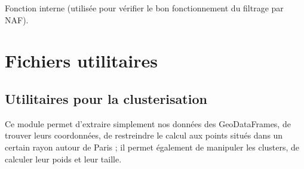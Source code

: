 \documentclass[letterpaper,10pt,french]{sphinxmanual}
\begin{document}
\begin{fulllineitems}
\label{\detokenize{index:src.clusterizer.clusterizer.test_naf}}
\sphinxAtStartPar
Fonction interne (utilisée pour vérifier le bon fonctionnement du filtrage par NAF).

\end{fulllineitems}



\section{Fichiers utilitaires}
\label{\detokenize{index:fichiers-utilitaires}}

\subsection{Utilitaires pour la clusterisation}
\label{\detokenize{index:module-src.clusterizer.utils.clusterizer_utils}}\label{\detokenize{index:utilitaires-pour-la-clusterisation}}
\sphinxAtStartPar
Ce module permet d’extraire simplement nos données des GeoDataFrames, de trouver
leurs coordonnées, de restreindre le calcul aux points situés dans un certain rayon
autour de Paris ; il permet également de manipuler les clusters, de calculer leur 
poids et leur taille.
\end{document}

